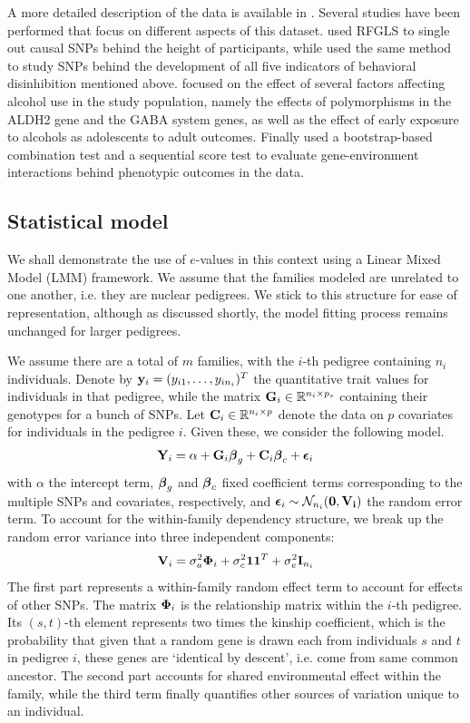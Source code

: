 A more detailed description of the data is available  in \cite{MillerEtal12}. Several studies have been performed that focus on different aspects of this dataset. \cite{LiEtal11} used RFGLS to single out causal SNPs behind the height of participants, while \cite{McGueEtal13} used the same method to study SNPs behind the development of all five indicators of behavioral disinhibition mentioned above. \cite{IronsThesis12} focused on the effect of several factors affecting alcohol use in the study population, namely the effects of polymorphisms in the ALDH2 gene and the GABA system genes, as well as the effect of early exposure to alcohols as adolescents to adult outcomes. Finally \cite{CoombesThesis16} used a bootstrap-based combination test and a sequential score test to evaluate gene-environment interactions behind phenotypic outcomes in the data.

\subsection{Statistical model}
We shall demonstrate the use of $e$-values in this context using a Linear Mixed Model (LMM) framework. We assume that the families modeled are unrelated to one another, i.e. they are nuclear pedigrees. We stick to this structure for ease of representation, although as discussed shortly, the model fitting process remains unchanged for larger pedigrees.

We assume there are a total of $m$ families, with the $i$-th pedigree containing $n_i$ individuals. Denote by ${\bf{y}}_i = (y_{i 1}, \ldots, y_{i n_i})^T $ the quantitative trait values for individuals in that pedigree, while the matrix ${\mathbf{G}}_i \in {\mathbb{R}}^{ n_i \times p_s}$ containing their genotypes for a bunch of SNPs. Let ${\mathbf{C}}_i \in {\mathbb{R}}^{ n_i \times p}$ denote the data on $p$ covariates for individuals in the pedigree $i$. Given these, we consider the following model.
%
\begin{align}\label{eqn:LMMeqn}
{\mathbf{Y}}_i = \alpha + {\mathbf{G}}_i {\boldsymbol{\beta}}_g + {\mathbf{C}}_i {\boldsymbol{\beta}}_c + {\boldsymbol{\epsilon}}_i
\end{align}
%
with $\alpha$ the intercept term, ${\boldsymbol{\beta}}_g$ and ${\boldsymbol{\beta}}_c$ fixed coefficient terms corresponding to the multiple SNPs and covariates, respectively, and ${\boldsymbol{\epsilon}}_i \sim {\cal{N}}_{n_i} (\bf 0, {\mathbf{V}}_i)$ the random error term. To account for the within-family dependency structure, we break up the random error variance into three independent components:
%
\begin{align}\label{eqn:partsOfV}
{\mathbf{V}}_i = \sigma_a^2 {\boldsymbol{\Phi}}_i + \sigma_c^2 {\bf 1} {\bf 1}^T + \sigma_e^2 {\mathbf{I}}_{n_i}
\end{align}
%
The first part represents a within-family random effect term to account for effects of other SNPs. The matrix ${\boldsymbol{\Phi}}_i$ is the relationship matrix within the $i$-th pedigree. Its $(s,t)$-th element represents two times the kinship coefficient, which is the probability that given that a random gene is drawn each from individuals $s$ and $t$ in pedigree $i$, these genes are `identical by descent', i.e. come from same common ancestor. The second part accounts for shared environmental effect within the family, while the third term finally quantifies other sources of variation unique to an individual.

